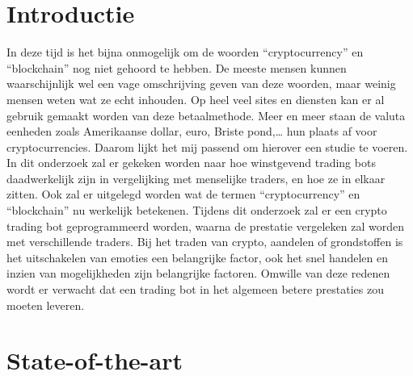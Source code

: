 
\section{Introductie} %
\label{sec:introductie}

In deze tijd is het bijna onmogelijk om de woorden “cryptocurrency” en “blockchain” nog niet gehoord te hebben. De meeste mensen kunnen waarschijnlijk wel een vage omschrijving geven van deze woorden, maar weinig mensen weten wat ze echt inhouden. Op heel veel sites en diensten kan er al gebruik gemaakt worden van deze betaalmethode. Meer en meer staan de valuta eenheden zoals Amerikaanse dollar, euro, Briste pond,… hun plaats af voor cryptocurrencies. Daarom lijkt het mij passend om hierover een studie te voeren. In dit onderzoek zal er gekeken worden naar hoe winstgevend trading bots daadwerkelijk zijn in vergelijking met menselijke traders, en hoe ze in elkaar zitten.
Ook zal er uitgelegd worden wat de termen “cryptocurrency” en “blockchain” nu werkelijk betekenen. Tijdens dit onderzoek zal er een crypto trading bot geprogrammeerd worden, waarna de prestatie vergeleken zal worden met verschillende traders. Bij het traden van crypto, aandelen of grondstoffen is het uitschakelen van emoties een belangrijke factor, ook het snel handelen en inzien van mogelijkheden zijn belangrijke factoren. Omwille van deze redenen wordt er verwacht dat een trading bot in het algemeen betere prestaties zou moeten leveren.



\section{State-of-the-art}
\label{sec:state-of-the-art}

